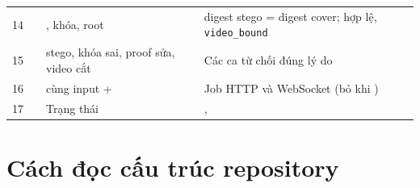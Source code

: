 \documentclass[11pt,a4paper]{article}
\begin{document}
\begin{longtable}{P{.05\textwidth}P{.29\textwidth}P{.26\textwidth}P{.27\textwidth}}
14 &  & , khóa, root & digest stego = digest cover;  hợp lệ, \texttt{video\_bound} \\
15 &  & stego, khóa sai, proof sửa, video cắt & Các ca từ chối đúng lý do \\
16 &  & cùng input +  & Job HTTP và WebSocket (bỏ khi ) \\
17 &  & Trạng thái & ,  \\
\bottomrule
\end{longtable}

\section{Cách đọc cấu trúc repository}
\end{document}
